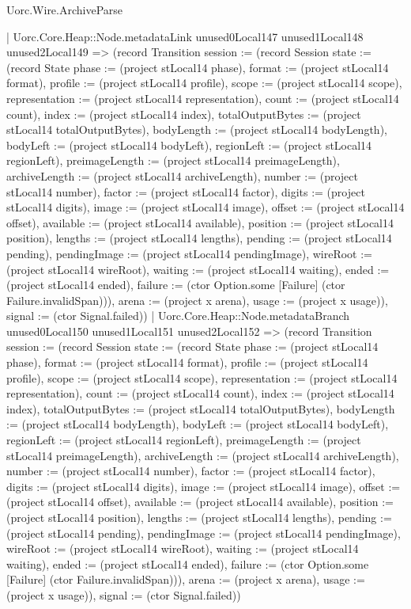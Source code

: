 \begin{lexlean}{Uorc.Wire.ArchiveParse}
\begin{semanticmodule}
{            | Uorc.Core.Heap::Node.metadataLink unused0Local147 unused1Local148 unused2Local149 => (record Transition {session := (record Session {state := (record State {phase := (project stLocal14 phase), format := (project stLocal14 format), profile := (project stLocal14 profile), scope := (project stLocal14 scope), representation := (project stLocal14 representation), count := (project stLocal14 count), index := (project stLocal14 index), totalOutputBytes := (project stLocal14 totalOutputBytes), bodyLength := (project stLocal14 bodyLength), bodyLeft := (project stLocal14 bodyLeft), regionLeft := (project stLocal14 regionLeft), preimageLength := (project stLocal14 preimageLength), archiveLength := (project stLocal14 archiveLength), number := (project stLocal14 number), factor := (project stLocal14 factor), digits := (project stLocal14 digits), image := (project stLocal14 image), offset := (project stLocal14 offset), available := (project stLocal14 available), position := (project stLocal14 position), lengths := (project stLocal14 lengths), pending := (project stLocal14 pending), pendingImage := (project stLocal14 pendingImage), wireRoot := (project stLocal14 wireRoot), waiting := (project stLocal14 waiting), ended := (project stLocal14 ended), failure := (ctor Option.some [Failure] (ctor Failure.invalidSpan))}), arena := (project x arena), usage := (project x usage)}), signal := (ctor Signal.failed)})
            | Uorc.Core.Heap::Node.metadataBranch unused0Local150 unused1Local151 unused2Local152 => (record Transition {session := (record Session {state := (record State {phase := (project stLocal14 phase), format := (project stLocal14 format), profile := (project stLocal14 profile), scope := (project stLocal14 scope), representation := (project stLocal14 representation), count := (project stLocal14 count), index := (project stLocal14 index), totalOutputBytes := (project stLocal14 totalOutputBytes), bodyLength := (project stLocal14 bodyLength), bodyLeft := (project stLocal14 bodyLeft), regionLeft := (project stLocal14 regionLeft), preimageLength := (project stLocal14 preimageLength), archiveLength := (project stLocal14 archiveLength), number := (project stLocal14 number), factor := (project stLocal14 factor), digits := (project stLocal14 digits), image := (project stLocal14 image), offset := (project stLocal14 offset), available := (project stLocal14 available), position := (project stLocal14 position), lengths := (project stLocal14 lengths), pending := (project stLocal14 pending), pendingImage := (project stLocal14 pendingImage), wireRoot := (project stLocal14 wireRoot), waiting := (project stLocal14 waiting), ended := (project stLocal14 ended), failure := (ctor Option.some [Failure] (ctor Failure.invalidSpan))}), arena := (project x arena), usage := (project x usage)}), signal := (ctor Signal.failed)})
}
\end{semanticmodule}
\end{lexlean}
